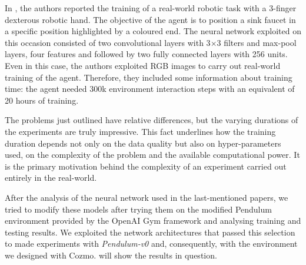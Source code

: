In \cite{haarnoja2018alg}, the authors reported the training of a real-world robotic task with a 3-finger dexterous robotic hand.
The objective of the agent is to position a sink faucet in a specific position highlighted by a coloured end.
The neural network exploited on this occasion consisted of two convolutional layers with 3$\times$3 filters and max-pool layers, four features and followed by two fully connected layers with 256 units.
Even in this case, the authors exploited RGB images to carry out real-world training of the agent.
Therefore, they included some information about training time: the agent needed 300k environment interaction steps with an equivalent of 20 hours of training.

The problems just outlined have relative differences, but the varying durations of the experiments are truly impressive.
This fact underlines how the training duration depends not only on the data quality but also on hyper-parameters used, on the complexity of the problem and the available computational power.
It is the primary motivation behind the complexity of an experiment carried out entirely in the real-world.

After the analysis of the neural network used in the last-mentioned papers, we tried to modify these models after trying them on the modified Pendulum environment provided by the OpenAI Gym framework and analysing training and testing results.
We exploited the network architectures that passed this selection to made experiments with \textit{Pendulum-v0} and, consequently, with the environment we designed with Cozmo.
 will show the results in question.

